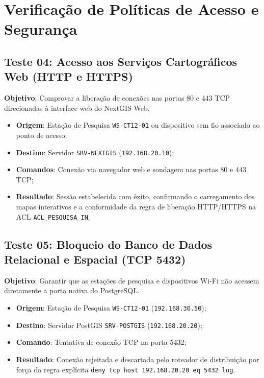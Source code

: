 \section{Verificação de Políticas de Acesso e Segurança}

\subsection{Teste 04: Acesso aos Serviços Cartográficos Web (HTTP e HTTPS)}
\textbf{Objetivo}: Comprovar a liberação de conexões nas portas 80 e 443 TCP direcionadas à interface web do NextGIS Web.
\begin{itemize}
    \item \textbf{Origem}: Estação de Pesquisa \texttt{WS-CT12-01} ou dispositivo sem fio associado ao ponto de acesso;
    \item \textbf{Destino}: Servidor \texttt{SRV-NEXTGIS} (\texttt{192.168.20.10});
    \item \textbf{Comandos}: Conexão via navegador web e sondagem nas portas 80 e 443 TCP;
    \item \textbf{Resultado}: Sessão estabelecida com êxito, confirmando o carregamento dos mapas interativos e a conformidade da regra de liberação HTTP/HTTPS na ACL \texttt{ACL\_PESQUISA\_IN}.
\end{itemize}

\subsection{Teste 05: Bloqueio do Banco de Dados Relacional e Espacial (TCP 5432)}
\textbf{Objetivo}: Garantir que as estações de pesquisa e dispositivos Wi-Fi não acessem diretamente a porta nativa do PostgreSQL.
\begin{itemize}
    \item \textbf{Origem}: Estação de Pesquisa \texttt{WS-CT12-01} (\texttt{192.168.30.50});
    \item \textbf{Destino}: Servidor PostGIS \texttt{SRV-POSTGIS} (\texttt{192.168.20.20});
    \item \textbf{Comando}: Tentativa de conexão TCP na porta 5432;
    \item \textbf{Resultado}: Conexão rejeitada e descartada pelo roteador de distribuição por força da regra explícita \texttt{deny tcp host 192.168.20.20 eq 5432 log}.
\end{itemize}

